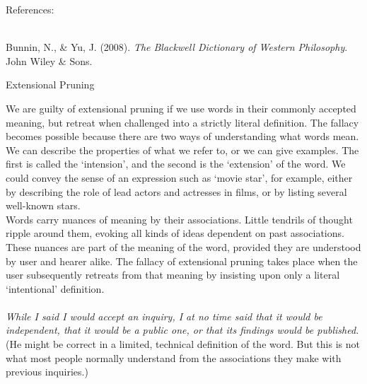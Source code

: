 \documentclass[a4paper,12pt,single,pdftex]{scrartcl}
\begin{document}
    References:

    
      
        
      \\

      
        
          Bunnin, N., \& Yu, J. (2008). {\it The Blackwell Dictionary of Western Philosophy}. John Wiley \& Sons.
        
      
    
  

Extensional Pruning
    
      We are guilty of extensional pruning if we use words in their commonly accepted meaning, but retreat when challenged into a strictly literal definition. The fallacy becomes possible because there are two ways of understanding what words mean. We can describe the properties of what we refer to, or we can give examples. The first is called the ‘intension’, and the second is the ‘extension’ of the word. We could convey the sense of an expression such as ‘movie star’, for example, either by describing the role of lead actors and actresses in films, or by listing several well-known stars.
    \\

    
      Words carry nuances of meaning by their associations. Little tendrils of thought ripple around them, evoking all kinds of ideas dependent on past associations. These nuances are part of the meaning of the word, provided they are understood by user and hearer alike. The fallacy of extensional pruning takes place when the user subsequently retreats from that meaning by insisting upon only a literal ‘intentional’ definition.
    \\

    
       
    \\

    
      {\em While I said I would accept an inquiry, I at no time said that it would be independent, that it would be a public one, or that its findings would be published.}
    \\

    
      (He might be correct in a limited, technical definition of the word. But this is not what most people normally understand from the associations they make with previous inquiries.)
    \\

    
       
    \\
\end{document}
